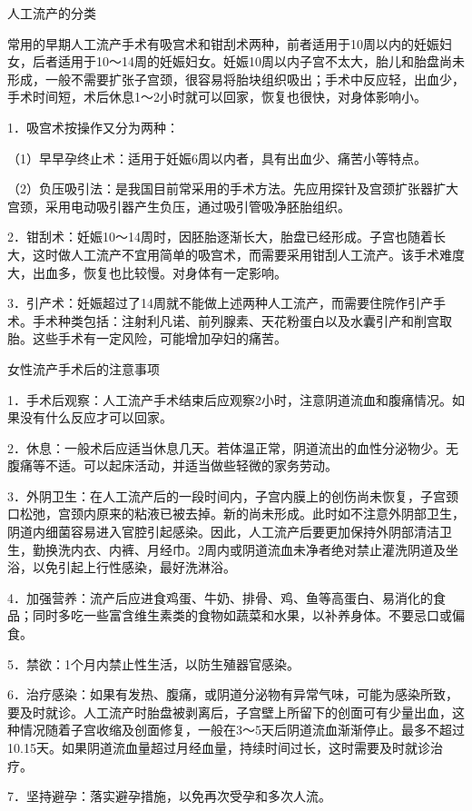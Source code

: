 \documentclass[12pt,UTF8,openany]{ctexbook}
\begin{document}
人工流产的分类


常用的早期人工流产手术有吸宫术和钳刮术两种，前者适用于10周以内的妊娠妇女，后者适用于10～14周的妊娠妇女。妊娠10周以内子宫不太大，胎儿和胎盘尚未形成，一般不需要扩张子宫颈，很容易将胎块组织吸出；手术中反应轻，出血少，手术时间短，术后休息1～2小时就可以回家，恢复也很快，对身体影响小。

1．吸宫术按操作又分为两种：

（1）早早孕终止术：适用于妊娠6周以内者，具有出血少、痛苦小等特点。

（2）负压吸引法：是我国目前常采用的手术方法。先应用探针及宫颈扩张器扩大宫颈，采用电动吸引器产生负压，通过吸引管吸净胚胎组织。

2．钳刮术：妊娠10～14周时，因胚胎逐渐长大，胎盘已经形成。子宫也随着长大，这时做人工流产不宜用简单的吸宫术，而需要采用钳刮人工流产。该手术难度大，出血多，恢复也比较慢。对身体有一定影响。

3．引产术：妊娠超过了14周就不能做上述两种人工流产，而需要住院作引产手术。手术种类包括：注射利凡诺、前列腺素、天花粉蛋白以及水囊引产和削宫取胎。这些手术有一定风险，可能增加孕妇的痛苦。





女性流产手术后的注意事项


1．手术后观察：人工流产手术结束后应观察2小时，注意阴道流血和腹痛情况。如果没有什么反应才可以回家。

2．休息：一般术后应适当休息几天。若体温正常，阴道流出的血性分泌物少。无腹痛等不适。可以起床活动，并适当做些轻微的家务劳动。

3．外阴卫生：在人工流产后的一段时间内，子宫内膜上的创伤尚未恢复，子宫颈口松弛，宫颈内原来的粘液已被去掉。新的尚未形成。此时如不注意外阴部卫生，阴道内细菌容易进入官腔引起感染。因此，人工流产后要更加保持外阴部清洁卫生，勤换洗内衣、内裤、月经巾。2周内或阴道流血未净者绝对禁止灌洗阴道及坐浴，以免引起上行性感染，最好洗淋浴。

4．加强营养：流产后应进食鸡蛋、牛奶、排骨、鸡、鱼等高蛋白、易消化的食品；同时多吃一些富含维生素类的食物如蔬菜和水果，以补养身体。不要忌口或偏食。

5．禁欲：1个月内禁止性生活，以防生殖器官感染。

6．治疗感染：如果有发热、腹痛，或阴道分泌物有异常气味，可能为感染所致，要及时就诊。人工流产时胎盘被剥离后，子宫壁上所留下的创面可有少量出血，这种情况随着子宫收缩及创面修复，一般在3～5天后阴道流血渐渐停止。最多不超过10.15天。如果阴道流血量超过月经血量，持续时间过长，这时需要及时就诊治疗。

7．坚持避孕：落实避孕措施，以免再次受孕和多次人流。
\end{document}

